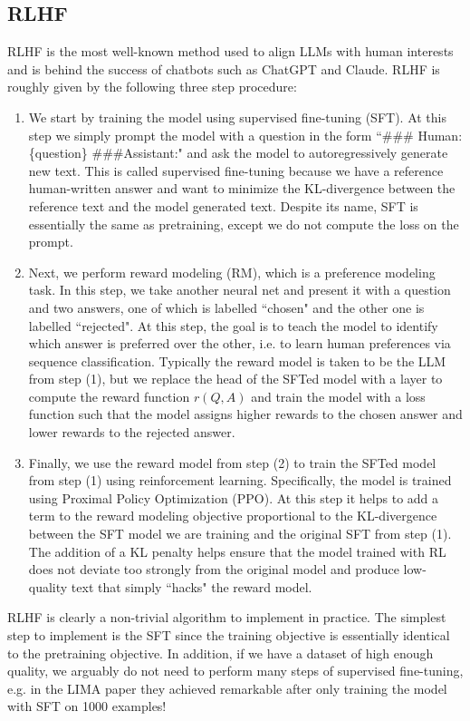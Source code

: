 \documentclass[11pt, oneside]{article}   	%
\begin{document}
 \subsection{RLHF}
RLHF is the most well-known method used to align LLMs with human interests and is behind the success of chatbots such as ChatGPT and Claude.
RLHF is roughly given by the following three step procedure:
\begin{enumerate}
\item We start by training the model using supervised fine-tuning (SFT). At this step we simply prompt the model with a question in the form ``\#\#\# Human: \{question\} \#\#\#Assistant:" and ask the model to autoregressively generate new text. This is called supervised fine-tuning because we have a reference human-written answer and want to minimize the KL-divergence between the reference text and the model generated text. Despite its name, SFT is essentially the same as pretraining, except we do not compute the loss on the prompt.

\item Next, we perform reward modeling (RM), which is a preference modeling task.
In this step, we take another neural net and present it with a question and two answers, one of which is labelled ``chosen" and the other one is labelled ``rejected".
At this step, the goal is to teach the model to identify which answer is preferred over the other, i.e. to learn human preferences via sequence classification. 
Typically the reward model is taken to be the LLM from step (1), but we replace the head of the SFTed model with a layer to compute the reward function $r(Q,A)$ and train the model with a loss function such that the model assigns higher rewards to the chosen answer and lower rewards to the rejected answer. 

\item Finally, we use the reward model from step (2) to train the SFTed model from step (1) using reinforcement learning.
Specifically, the model is trained using Proximal Policy Optimization (PPO).
At this step it helps to add a term to the reward modeling objective proportional to the KL-divergence between the SFT model we are training and the original SFT from step (1).
The addition of a KL penalty helps ensure that the model trained with RL does not deviate too strongly from the original model and produce low-quality text that simply ``hacks" the reward model.
\end{enumerate}

RLHF is clearly a non-trivial algorithm to implement in practice. 
The simplest step to implement is the SFT since the training objective is essentially identical to the pretraining objective. 
In addition, if we have a dataset of high enough quality, we arguably do not need to perform many steps of supervised fine-tuning, e.g. in the LIMA paper they achieved remarkable after only training the model with SFT on 1000 examples!
\end{document}
